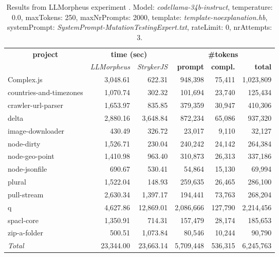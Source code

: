 
\begin{table*}[hbt!]
\centering
{\scriptsize
\begin{tabular}{l||r|r|r|r|r}
\multicolumn{1}{c|}{\bf project} & \multicolumn{2}{|c|}{\bf time (sec)} & \multicolumn{3}{|c|}{\bf \#tokens} \\
               & {\it LLMorpheus} & {\it StrykerJS} & {\bf prompt} & {\bf compl.} & {\bf total} \\
\hline
  Complex.js & 3,048.61 & 622.31 & 948,398 & 75,411 & 1,023,809 \\ 
countries-and-timezones & 1,070.74 & 302.32 & 101,694 & 23,740 & 125,434 \\ 
crawler-url-parser & 1,653.97 & 835.85 & 379,359 & 30,947 & 410,306 \\ 
delta & 2,880.16 & 3,648.84 & 872,234 & 65,086 & 937,320 \\ 
image-downloader & 430.49 & 326.72 & 23,017 & 9,110 & 32,127 \\ 
node-dirty & 1,526.71 & 230.04 & 240,242 & 24,142 & 264,384 \\ 
node-geo-point & 1,410.98 & 963.40 & 310,873 & 26,313 & 337,186 \\ 
node-jsonfile & 690.67 & 530.41 & 54,864 & 15,130 & 69,994 \\ 
plural & 1,522.04 & 148.93 & 259,635 & 26,465 & 286,100 \\ 
pull-stream & 2,630.34 & 1,397.17 & 194,441 & 73,763 & 268,204 \\ 
q & 4,627.86 & 12,869.01 & 2,086,666 & 127,790 & 2,214,456 \\ 
spacl-core & 1,350.91 & 714.31 & 157,479 & 28,174 & 185,653 \\ 
zip-a-folder & 500.51 & 1,073.84 & 80,546 & 10,244 & 90,790 \\ 
\hline
  \textit{Total} & 23,344.00 & 23,663.14 & 5,709,448 & 536,315 & 6,245,763 \\
  \end{tabular}
  }
  \\[2mm]
  \caption{Results from LLMorpheus experiment .
    Model: \textit{codellama-34b-instruct}, 
    temperature: 0.0, 
    maxTokens: 250, 
    maxNrPrompts: 2000, 
    template: \textit{template-noexplanation.hb}, 
    systemPrompt: \textit{SystemPrompt-MutationTestingExpert.txt}, 
    rateLimit: 0, 
    nrAttempts: 3.  
  }
  \label{table:Cost:run377:codellama-34b-instruct:template-noexplanation.hb:0.0}
\end{table*}